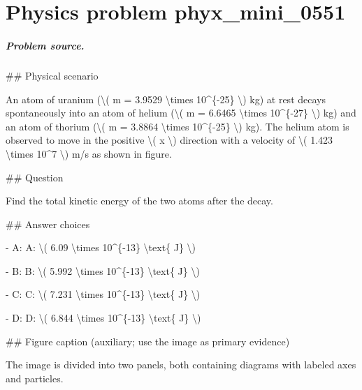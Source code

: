 
\chapter{Physics problem phyx\_mini\_0551}
\label{ch:PhyXMiniProblems_problem_phyx_mini_0551}

\paragraph{Problem source.}
\#\# Physical scenario

An atom of uranium (\textbackslash{}( m = 3.9529 \textbackslash{}times 10\textasciicircum{}\{-25\} \textbackslash{}) kg) at rest decays spontaneously into an atom of helium (\textbackslash{}( m = 6.6465 \textbackslash{}times 10\textasciicircum{}\{-27\} \textbackslash{}) kg) and an atom of thorium (\textbackslash{}( m = 3.8864 \textbackslash{}times 10\textasciicircum{}\{-25\} \textbackslash{}) kg). The helium atom is observed to move in the positive \textbackslash{}( x \textbackslash{}) direction with a velocity of \textbackslash{}( 1.423 \textbackslash{}times 10\textasciicircum{}7 \textbackslash{}) m/s as shown in figure.

\#\# Question

Find the total kinetic energy of the two atoms after the decay.

\#\# Answer choices

- A: A: \textbackslash{}( 6.09 \textbackslash{}times 10\textasciicircum{}\{-13\} \textbackslash{}text\{ J\} \textbackslash{})

- B: B: \textbackslash{}( 5.992 \textbackslash{}times 10\textasciicircum{}\{-13\} \textbackslash{}text\{ J\} \textbackslash{})

- C: C: \textbackslash{}( 7.231 \textbackslash{}times 10\textasciicircum{}\{-13\} \textbackslash{}text\{ J\} \textbackslash{})

- D: D: \textbackslash{}( 6.844 \textbackslash{}times 10\textasciicircum{}\{-13\} \textbackslash{}text\{ J\} \textbackslash{})

\#\# Figure caption (auxiliary; use the image as primary evidence)

The image is divided into two panels, both containing diagrams with labeled axes and particles.

